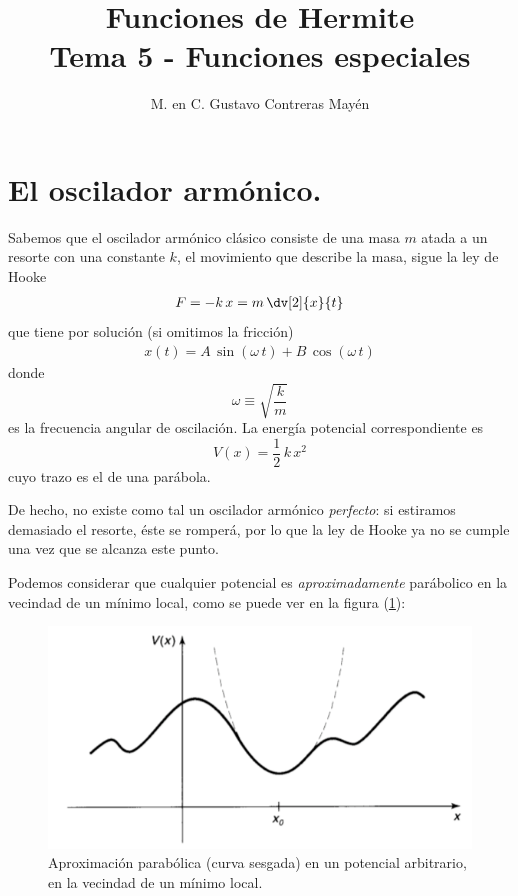 
\usepackage{apacite}
\title{Funciones de Hermite \\ \large {Tema 5 - Funciones especiales} \vspace{-3ex}}
\author{M. en C. Gustavo Contreras Mayén}
\date{ }

\vspace{-4cm}
\maketitle
\fontsize{14}{14}\selectfont
\tableofcontents
\newpage
\section{El oscilador armónico.}
Sabemos que el oscilador armónico clásico consiste de una masa $m$ atada a un resorte con una constante $k$, el movimiento que describe la masa, sigue la ley de Hooke
\begin{align*}
F = - k \, x = m \, \dv[2]{x}{t}
\end{align*}
que tiene por solución (si omitimos la fricción)
\begin{align*}
x(t) = A \, \sin (\omega \, t) + B \, \cos (\omega \, t)
\end{align*}
donde
\begin{equation}
\omega \equiv \sqrt{\dfrac{k}{m}}
\label{eq:ecuacion_02_041}
\end{equation}
es la frecuencia angular de oscilación. La energía potencial correspondiente es
\begin{equation}
V(x) = \dfrac{1}{2} \, k \, x^{2}
\label{eq:ecuacion_02_042}
\end{equation}
cuyo trazo es el de una parábola.
\par
De hecho, no existe como tal un oscilador armónico \emph{perfecto}: si estiramos demasiado el resorte, éste se romperá, por lo que la ley de Hooke ya no se cumple una vez que se alcanza este punto.
\par
Podemos considerar que cualquier potencial es \textit{aproximadamente} parábolico en la vecindad de un mínimo local, como se puede ver en la figura (\ref{fig:figura_02_04}):
\begin{figure}[H]
    \centering
    \includegraphics[scale=0.5]{Imagenes/Potencial_arbitrario.png}
    \caption{Aproximación parabólica (curva sesgada) en un potencial arbitrario, en la vecindad de un mínimo local.}
    \label{fig:figura_02_04}
\end{figure}
